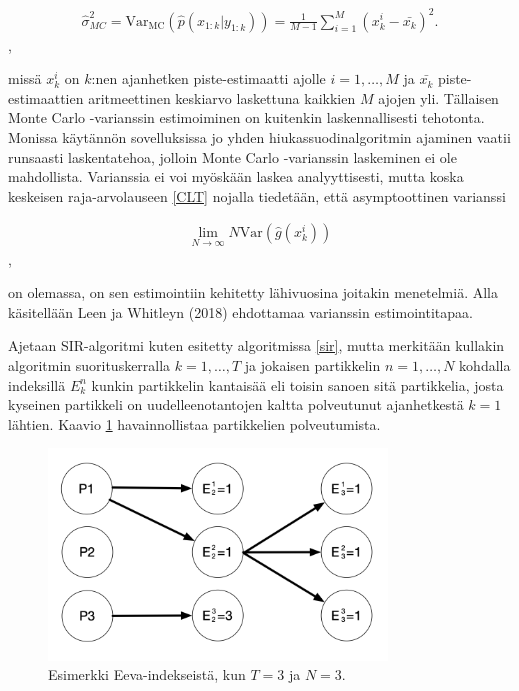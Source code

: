 \documentclass[
  12pt,
  a4paper, twoside]{book}
\begin{document}
\begin{align}\label{MC-varianssi}
\hat{\sigma}^2_{MC} = \text{Var}_{\text{MC}}(\hat{p}(x_{1:k}|y_{1:k})) = \frac{1}{M-1} \sum_{i=1}^{M}(x_k^i-\bar{x_k})^2.
\end{align},

missä \(x_k^i\) on \(k\):nen ajanhetken piste-estimaatti ajolle \(i=1,\ldots,M\) ja \(\bar{x_k}\) piste-estimaattien aritmeettinen keskiarvo laskettuna kaikkien \(M\) ajojen yli. Tällaisen Monte Carlo -varianssin estimoiminen on kuitenkin laskennallisesti tehotonta. Monissa käytännön sovelluksissa jo yhden hiukassuodinalgoritmin ajaminen vaatii runsaasti laskentatehoa, jolloin Monte Carlo -varianssin laskeminen ei ole mahdollista. Varianssia ei voi myöskään laskea analyyttisesti, mutta koska keskeisen raja-arvolauseen \ref{CLT} nojalla tiedetään, että asymptoottinen varianssi

\begin{align}\label{asymptoottinen-varianssi}
\lim_{N\to \infty} N \text {Var}(\hat{g}(x_k^i))
\end{align},

on olemassa, on sen estimointiin kehitetty lähivuosina joitakin menetelmiä. Alla käsitellään Leen ja Whitleyn (2018) ehdottamaa varianssin estimointitapaa. \citep{Lee-2018}

Ajetaan SIR-algoritmi kuten esitetty algoritmissa \ref{sir}, mutta merkitään kullakin algoritmin suorituskerralla \(k=1,\ldots,T\) ja jokaisen partikkelin \(n=1,\ldots,N\) kohdalla indeksillä \(E_k^n\) kunkin partikkelin kantaisää eli toisin sanoen sitä partikkelia, josta kyseinen partikkeli on uudelleenotantojen kaltta polveutunut ajanhetkestä \(k=1\) lähtien. Kaavio \ref{fig:eeva-indeksit} havainnollistaa partikkelien polveutumista.

\begin{figure}[H]
\centering
\includegraphics[width=9cm]{eevaindeksit}
\caption{Esimerkki Eeva-indekseistä, kun $T=3$ ja $N=3$.}
\label{fig:eeva-indeksit}
\end{figure}
\end{document}
